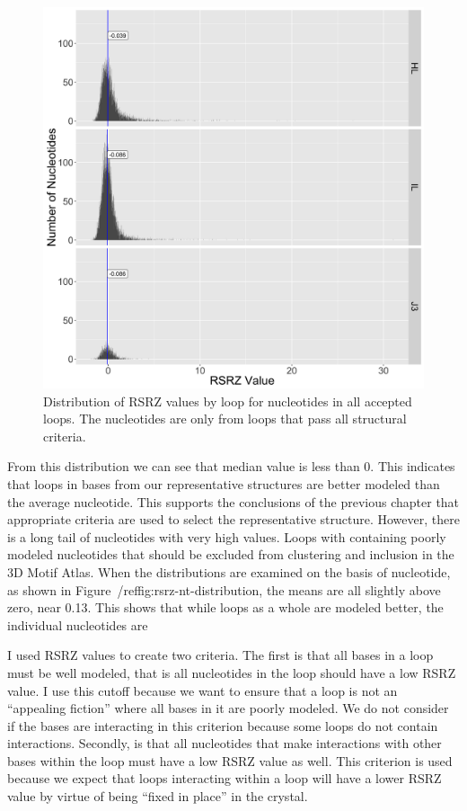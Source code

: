 \begin{figure}
  \includegraphics[width=0.5\linewidth]{chapter-5/figs/loops/rsrz-distribution}
  \caption{Distribution of RSRZ values by loop for nucleotides in all accepted
  loops. The nucleotides are only from loops that pass all structural criteria.}
  \label{fig:rsrz-distribution}
\end{figure}

From this distribution we can see that median value is less than 0. This
indicates that loops in bases from our representative structures are better
modeled than the average nucleotide. This supports the conclusions of the
previous chapter that appropriate criteria are used to select the representative
structure. However, there is a long tail of nucleotides with very high values.
Loops with containing poorly modeled nucleotides that should be excluded from
clustering and inclusion in the 3D Motif Atlas. When the distributions are examined
on the basis of nucleotide, as shown in Figure~/ref{fig:rsrz-nt-distribution},
the means are all slightly above zero, near 0.13. This shows that while loops as
a whole are modeled better, the individual nucleotides are 


I used RSRZ values to create two criteria. The first is that all bases in a loop
must be well modeled, that is all nucleotides in the loop should have a low RSRZ
value. I use this cutoff because we want to ensure that a loop is not an
``appealing fiction'' where all bases in it are poorly modeled. We do not
consider if the bases are interacting in this criterion because some loops do
not contain interactions. Secondly, is that all nucleotides that make
interactions with other bases within the loop must have a low RSRZ value as
well. This criterion is used because we expect that loops interacting within a
loop will have a lower RSRZ value by virtue of being ``fixed in place'' in the
crystal.

